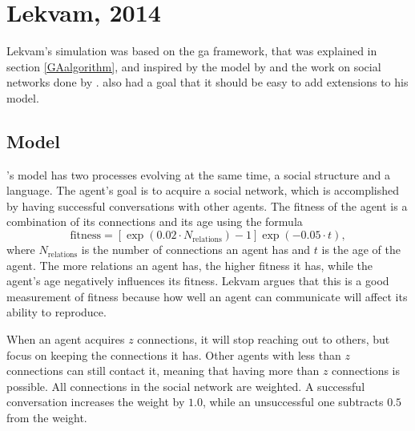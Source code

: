 \section{Lekvam, 2014}
Lekvam's simulation \citep{lekvam2014co} was based on the \ac{ga} framework, that was explained in section \ref{GAalgorithm}, and inspired by the model by \citet{lipowska2011naming} and the work on social networks done by \citet{quillinan2006social}. \citeauthor{lekvam2014co} also had a goal that it should be easy to add extensions to his model.

\subsection{Model} 
\citeauthor{lekvam2014co}'s model has two processes evolving at the same time, a social structure and a language. The agent's goal is to acquire a social network, which is accomplished by having successful conversations with other agents. The fitness of the agent is a combination of its connections and its age using the formula
\begin{equation}
    \mathrm{fitness} = [\exp(0.02 \cdot N_\mathrm{relations}) - 1] \exp(-0.05 \cdot t),
\end{equation}
where $N_\mathrm{relations}$ is the number of connections an agent has and $t$ is the age of the agent. The more relations an agent has, the higher fitness it has, while the agent's age negatively influences its fitness. Lekvam argues that this is a good measurement of fitness because how well an agent can communicate will affect its ability to reproduce. 

When an agent acquires $z$ connections, it will stop reaching out to others, but focus on keeping the connections it has. Other agents with less than $z$ connections can still contact it, meaning that having more than $z$ connections is possible. All connections in the social network are weighted. A successful conversation increases the weight by $1.0$, while an unsuccessful one subtracts $0.5$ from the weight. 

